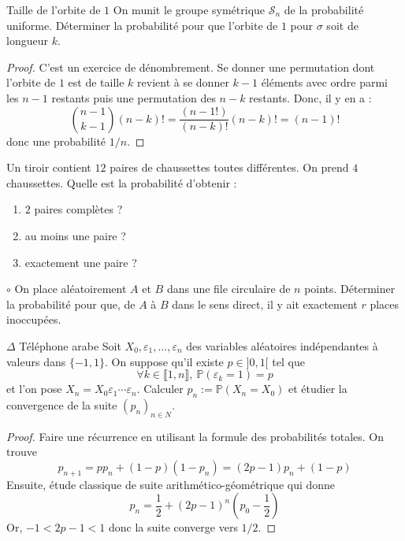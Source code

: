\documentclass[french,a4paper]{article}
\renewcommand{\P}{\mathbb{P}}
\theoremstyle{plain}
\theoremstyle{definition}
\theoremstyle{remark}
\begin{document}
\begin{ex}{Taille de l'orbite de $1$}
	On munit le groupe symétrique $\mathcal{S}_n$ de la probabilité uniforme. Déterminer la probabilité pour que l'orbite de $1$ pour $\sigma$ soit de longueur $k$.
\end{ex}
\begin{proof}
	C'est un exercice de dénombrement. Se donner une permutation dont l'orbite de $1$ est de taille $k$ revient à se donner $k-1$ éléments avec ordre parmi les $n-1$ restants puis une permutation des $n-k$ restants. Donc, il y en a : $$\binom{n-1}{k-1}(n-k)!=\frac{(n-1!)}{(n-k)!}(n-k)!=(n-1)!$$ donc une probabilité $1/n$.
\end{proof}

\begin{ex}{}
	Un tiroir contient $12$ paires de chaussettes toutes différentes. On prend $4$ chaussettes. Quelle est la probabilité d'obtenir :
	\begin{enumerate}
		\item $2$ paires complètes ?
		\item au moins une paire ?
		\item exactement une paire ?
	\end{enumerate}
\end{ex}

\begin{ex}{$\circ$}
	On place aléatoirement $A$ et $B$ dans une file circulaire de $n$ points. Déterminer la probabilité pour que, de $A$ à $B$ dans le sens direct, il y ait exactement $r$ places inoccupées.
\end{ex}

\begin{ex}{$\Delta$ Téléphone arabe}
	Soit $X_0,\varepsilon_1,\ldots,\varepsilon_n$ des variables aléatoires indépendantes à valeurs dans $\{-1,1\}$. On suppose qu'il existe $p\in]0,1[$ tel que $$\forall k\in\llbracket1,n\rrbracket,\ \P(\varepsilon_k=1)=p$$ et l'on pose $X_n=X_0\varepsilon_1\cdots\varepsilon_n$. Calculer $p_n:=\P(X_n=X_0)$ et étudier la convergence de la suite $(p_n)_{n\in N}$.
\end{ex}
\begin{proof}
	Faire une récurrence en utilisant la formule des probabilités totales. On trouve $$p_{n+1}=pp_n+(1-p)(1-p_n)=(2p-1)p_n+(1-p)$$ Ensuite, étude classique de suite arithmético-géométrique qui donne $$p_n=\frac{1}{2}+(2p-1)^n\left(p_0-\frac{1}{2}\right)$$ Or, $-1<2p-1<1$ donc la suite converge vers $1/2$.
\end{proof}
\end{document}
